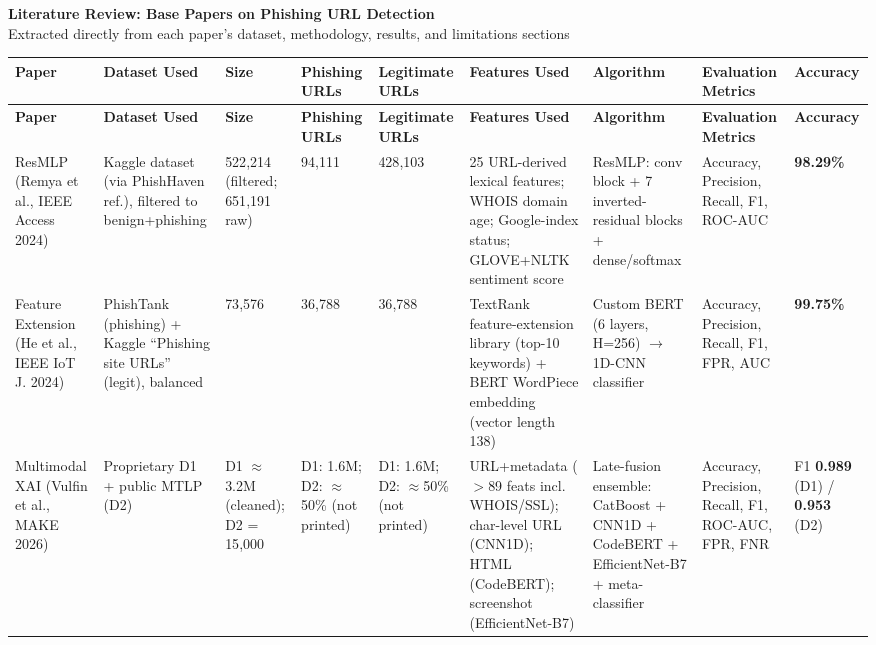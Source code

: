 \documentclass[10pt]{article}
\begin{document}
\begin{center}
{\LARGE \textbf{Literature Review: Base Papers on Phishing URL Detection}}\\[4pt]
{\large Extracted directly from each paper's dataset, methodology, results, and limitations sections}
\end{center}
\vspace{6pt}

\footnotesize
\begin{longtable}{L{2.6cm} L{2.6cm} L{1.8cm} L{2.7cm} L{2.7cm} L{4.4cm} L{3.4cm} L{2.6cm} L{3.0cm}}
\toprule
\textbf{Paper} & \textbf{Dataset Used} & \textbf{Size} & \textbf{Phishing URLs} & \textbf{Legitimate URLs} & \textbf{Features Used} & \textbf{Algorithm} & \textbf{Evaluation Metrics} & \textbf{Accuracy} \\
\midrule
\endfirsthead
\toprule
\textbf{Paper} & \textbf{Dataset Used} & \textbf{Size} & \textbf{Phishing URLs} & \textbf{Legitimate URLs} & \textbf{Features Used} & \textbf{Algorithm} & \textbf{Evaluation Metrics} & \textbf{Accuracy} \\
\midrule
\endhead
\bottomrule
\endfoot
\bottomrule
\endlastfoot

ResMLP (Remya et al., IEEE Access 2024)
 & Kaggle dataset (via PhishHaven ref.), filtered to benign+phishing
 & 522{,}214 (filtered; 651{,}191 raw)
 & 94{,}111
 & 428{,}103
 & 25 URL-derived lexical features; WHOIS domain age; Google-index status; GLOVE+NLTK sentiment score
 & ResMLP: conv block + 7 inverted-residual blocks + dense/softmax
 & Accuracy, Precision, Recall, F1, ROC-AUC
 & \textbf{98.29\%} \\

Feature Extension (He et al., IEEE IoT J. 2024)
 & PhishTank (phishing) + Kaggle ``Phishing site URLs'' (legit), balanced
 & 73{,}576
 & 36{,}788
 & 36{,}788
 & TextRank feature-extension library (top-10 keywords) + BERT WordPiece embedding (vector length 138)
 & Custom BERT (6 layers, H=256) $\rightarrow$ 1D-CNN classifier
 & Accuracy, Precision, Recall, F1, FPR, AUC
 & \textbf{99.75\%} \\

Multimodal XAI (Vulfin et al., MAKE 2026)
 & Proprietary D1 + public MTLP (D2)
 & D1 $\approx$3.2M (cleaned); D2 = 15{,}000
 & D1: 1.6M; D2: $\approx$50\% (not printed)
 & D1: 1.6M; D2: $\approx$50\% (not printed)
 & URL+metadata ($>$89 feats incl. WHOIS/SSL); char-level URL (CNN1D); HTML (CodeBERT); screenshot (EfficientNet-B7)
 & Late-fusion ensemble: CatBoost + CNN1D + CodeBERT + EfficientNet-B7 + meta-classifier
 & Accuracy, Precision, Recall, F1, ROC-AUC, FPR, FNR
 & F1 \textbf{0.989} (D1) / \textbf{0.953} (D2) \\


\end{longtable}
\end{document}
